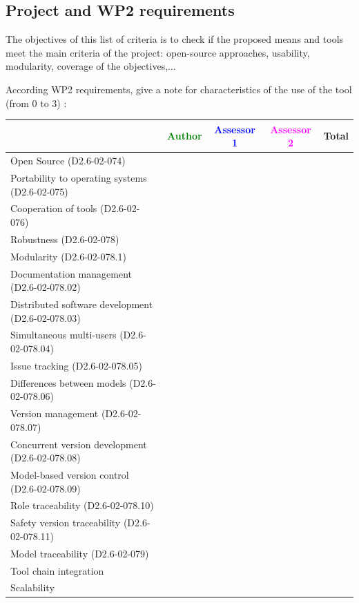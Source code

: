 \subsection{Project and WP2 requirements}

The objectives of this list of criteria is to check if the proposed means and tools meet the main criteria of the project: open-source approaches, usability, modularity, coverage of the objectives,...

According WP2 requirements, give a note for characteristics of the use of the tool (from 0 to 3) :

\begin{tabular}{|l | c | c | c | c|}
\hline
& \textcolor{green}{Author} & \textcolor{blue}{Assessor 1} & \textcolor{magenta}{Assessor 2} & Total \\
\hline 
Open Source (D2.6-02-074) & & & &  \\
\hline 
Portability to operating systems (D2.6-02-075) & & & &  \\
\hline
Cooperation of tools (D2.6-02-076) & & & &  \\
\hline
Robustness (D2.6-02-078) & & & & \\
\hline
Modularity (D2.6-02-078.1) & & & & \\
\hline
Documentation management (D2.6-02-078.02) & & & & \\
\hline
Distributed software development (D2.6-02-078.03)  & & & & \\
\hline
Simultaneous multi-users (D2.6-02-078.04)   & & & & \\
\hline
Issue tracking (D2.6-02-078.05) & & & & \\
\hline
Differences between models (D2.6-02-078.06) & & & & \\
\hline
Version management (D2.6-02-078.07) & & & & \\
\hline
Concurrent version development (D2.6-02-078.08) & & & & \\
\hline
Model-based version control (D2.6-02-078.09) & & & & \\
\hline
Role traceability (D2.6-02-078.10) & & & & \\
\hline
Safety version traceability (D2.6-02-078.11) & & & & \\
\hline
Model traceability (D2.6-02-079) & & & & \\
\hline
Tool chain integration & & & & \\
\hline
Scalability & & & & \\
\hline
\end{tabular}

